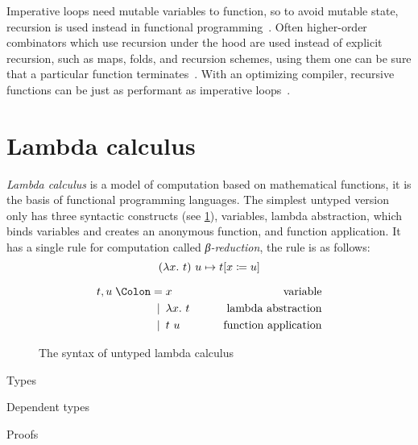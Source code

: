 Imperative loops need mutable variables to function, so to avoid mutable state,
recursion is used instead in functional programming~\cite{functional-Hudak}.
Often higher-order combinators which use recursion under the hood are used
instead of explicit recursion, such as maps, folds, and recursion schemes, using
them one can be sure that a particular function terminates~\cite{fold-Hutton,
  bananas-Meijer}. With an optimizing compiler, recursive functions can be just as
performant as imperative loops~\cite{sicp}.

\section{Lambda calculus}

\emph{Lambda calculus} is a model of computation based on mathematical
functions, it is the basis of functional programming languages. The simplest
untyped version only has three syntactic constructs (see
\cref{fig:lambda-syntax}), variables, lambda abstraction, which binds variables
and creates an anonymous function, and function application. It has a single
rule for computation called \emph{β-reduction}, the rule is as follows:
\[ (\lambda x.\ t)\ u \mapsto t[x \coloneqq u] \]

\begin{figure}
  \begin{alignat*}{2}
    t, u \Coleqq{} & x             & \qquad\text{variable}             \\
    \alt           & \lambda x.\ t & \qquad\text{lambda abstraction}   \\
    \alt           & t\ u          & \qquad\text{function application}
  \end{alignat*}
  \caption{The syntax of untyped lambda calculus}\label{fig:lambda-syntax}
\end{figure}

Types

Dependent types

Proofs
